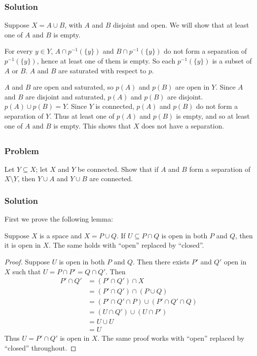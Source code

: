 \subsubsection{Solution}
Suppose $X = A \cup B$, with $A$ and $B$ disjoint and open. We will show that at least one of $A$ and $B$ is empty.

For every $y \in Y$, $A \cap p^{-1}(\{y\})$ and $B \cap p^{-1}(\{y\})$ do not form a separation of $p^{-1}(\{y\})$, hence at least one of them is empty. So each $p^{-1}(\{y\})$ is a subset of $A$ or $B$. $A$ and $B$ are saturated with respect to $p$.

$A$ and $B$ are open and saturated, so $p(A)$ and $p(B)$ are open in $Y$. Since $A$ and $B$ are disjoint and saturated, $p(A)$ and $p(B)$ are disjoint. $p(A) \cup p(B) = Y$. Since $Y$ is connected, $p(A)$ and $p(B)$ do not form a separation of $Y$. Thus at least one of $p(A)$ and $p(B)$ is empty, and so at least one of $A$ and $B$ is empty. This shows that $X$ does not have a separation.


\setcounter{subsection}{11} %
\subsection{}

\subsubsection{Problem}
Let $Y \subseteq X$; let $X$ and $Y$ be connected. Show that if $A$ and $B$ form a separation of $X \setminus Y$, then $Y \cup A$ and $Y \cup B$ are connected.

\subsubsection{Solution}
First we prove the following lemma:
\begin{lemma}
Suppose $X$ is a space and $X = P \cup Q$. If $U \subseteq P \cap Q$ is open in both $P$ and $Q$, then it is open in $X$. The same holds with ``open'' replaced by ``closed''.
\end{lemma}
\begin{proof}
Suppose $U$ is open in both $P$ and $Q$. Then there exists $P'$ and $Q'$ open in $X$ such that $U = P \cap P' = Q \cap Q'$. Then
\begin{align*}
P' \cap Q' &= (P' \cap Q') \cap X \\
&= (P' \cap Q') \cap (P \cup Q) \\
&= (P' \cap Q' \cap P) \cup (P' \cap Q' \cap Q) \\
&= (U \cap Q') \cup (U \cap P') \\
&= U \cup U \\
&= U
\end{align*}
Thus $U = P' \cap Q'$ is open in $X$. The same proof works with ``open'' replaced by ``closed'' throughout.
\end{proof}

